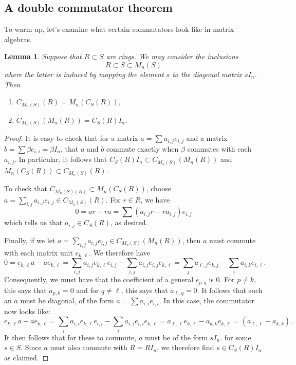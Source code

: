 \documentclass[12pt]{report}
\theoremstyle{plain}
\newtheorem{lem}[thm]{Lemma}
\begin{document}
\subsection{A double commutator theorem}

To warm up, let's examine what certain commutators look like in matrix
algebras.

\begin{lem} \label{commutator lemma}
Suppose that $R \subset S$ are rings. We may consider the inclusions 
\[R \subset S \subset M_n(S)\]
where the latter is induced by mapping the element $s$ to the diagonal
matrix
\(s I_n\). Then 
\begin{enumerate}[1. ]
\item \label{commutator 1} $C_{M_n(S)}(R) = M_n(C_S(R))$,
\item \label{commutator 2} $C_{M_n(S)}(M_n(R)) = C_S(R) I_n$.
\end{enumerate}
\end{lem}
\begin{proof}
It is easy to check that for a matrix $a = \sum a_{i,j} e_{i,j}$ and a
matrix $b = \sum \beta e_{i,i} = \beta I_n$, that $a$ and $b$ commute
exactly when $\beta$ commutes with each $a_{i,j}$. In particular, it
follows that $C_S(R) I_n \subset C_{M_n(S)}(M_n(R))$ and $M_n(C_S(R))
\subset C_{M_n(S)}(R)$.

To check that $C_{M_n(S)(R)} \subset M_n(C_S(R))$, choose $a = \sum_{i,j}
a_{i,j} e_{i,j}\in
C_{M_n(S)}(R)$. For $r \in R$, we have
\[0 = ar - ra = \sum (a_{i,j} r - r a_{i,j}) e_{i,j} \]
which tells us that $a_{i,j} \in C_S(R)$, as desired.

Finally, if we let $a = \sum_{i,j} a_{i,j} e_{i,j} \in C_{M_n(S)}(M_n(R))$,
then $a$ must commute with each matrix unit $e_{k,\ell}$. 
We therefore have 
\[0 = e_{k,\ell} a - a e_{k, \ell} = \sum_{i,j} a_{i,j} e_{k, \ell} e_{i,j} -
\sum_{i,j} a_{i,j} e_{i,j} e_{k,\ell} = \sum_j a_{\ell, j} e_{k, j} -
\sum_i a_{i, k} e_{i,\ell}.\]
Consequently, we must have that the
coefficient of a general $e_{p, q}$ is $0$. For $p \neq k$, this says that
$a_{p, k} = 0$ and for $q \neq \ell$, this says that $a_{\ell, q} = 0$.
It follows that such an $a$ must be diagonal, of the form $a
= \sum a_{i,i} e_{i,i}$. In this case, the commutator now looks like:
\[e_{k,\ell} a - a e_{k, \ell} = \sum_{i} a_{i,i} e_{k, \ell} e_{i,i} -
\sum_{i} a_{i,i} e_{i,i} e_{k,\ell} = a_{\ell, \ell} e_{k, \ell} - a_{k, k}
e_{k, \ell} = (a_{\ell, \ell} - a_{k,k}).\]
It then follows that for these to commute, $a$ must be of the form $s I_n$.
for some $s \in S$. Since $a$ must also commute with $R = R I_n$, we
therefore find $s \in C_S(R) I_n$ as claimed.
\end{proof}
\end{document}
